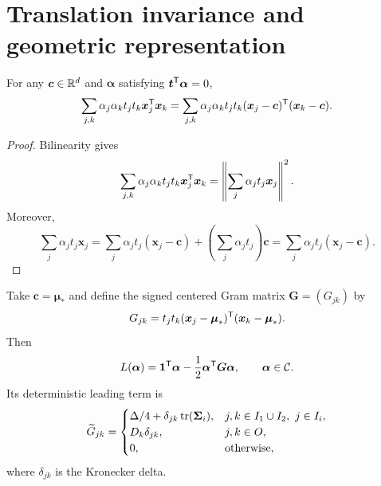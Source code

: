 \section{Translation invariance and geometric representation}

\begin{lemma}\label{lem:translation}
For any $\boldsymbol c\in\mathbb{R}^d$ and $\boldsymbol\alpha$ satisfying $\boldsymbol t^{\mathsf{T}}\boldsymbol\alpha=0$,
\[
\sum_{j,k}\alpha_j\alpha_k t_jt_k\boldsymbol x_j^{\mathsf{T}}\boldsymbol x_k
=
\sum_{j,k}\alpha_j\alpha_k t_jt_k(\boldsymbol x_j-\boldsymbol c)^{\mathsf{T}}(\boldsymbol x_k-\boldsymbol c).
\]
\end{lemma}
\begin{proof}
Bilinearity gives
\[
\sum_{j,k}\alpha_j\alpha_kt_jt_k\boldsymbol x_j^{\mathsf{T}}\boldsymbol x_k
=\left\lVert\sum_j\alpha_jt_j\boldsymbol x_j\right\rVert^2.
\]
Moreover,
\[
\sum_j\alpha_jt_j\boldsymbol x_j
=\sum_j\alpha_jt_j(\boldsymbol x_j-\boldsymbol c)
+\left(\sum_j\alpha_jt_j\right)\boldsymbol c
=\sum_j\alpha_jt_j(\boldsymbol x_j-\boldsymbol c).
\]
\end{proof}

Take $\boldsymbol c=\boldsymbol\mu_*$ and define the signed centered Gram matrix $\boldsymbol G=(G_{jk})$ by
\[
G_{jk}=t_jt_k(\boldsymbol x_j-\boldsymbol\mu_*)^{\mathsf{T}}(\boldsymbol x_k-\boldsymbol\mu_*).
\]
Then
\begin{equation}\label{eq:centered-dual}
L(\boldsymbol\alpha)=\mathbf{1}^{\mathsf{T}}\boldsymbol\alpha-\frac12\boldsymbol\alpha^{\mathsf{T}}\boldsymbol G\boldsymbol\alpha,
\qquad \boldsymbol\alpha\in\mathcal{C}.
\end{equation}
Its deterministic leading term is
\begin{equation}\label{eq:Gtilde}
\widetilde G_{jk}=
\begin{cases}
\Delta/4+\delta_{jk}\tr(\boldsymbol\Sigma_i),&j,k\in I_1\cup I_2,\ j\in I_i,\\
D_k\delta_{jk},&j,k\in O,\\
0,&\text{otherwise},
\end{cases}
\end{equation}
where $\delta_{jk}$ is the Kronecker delta.

